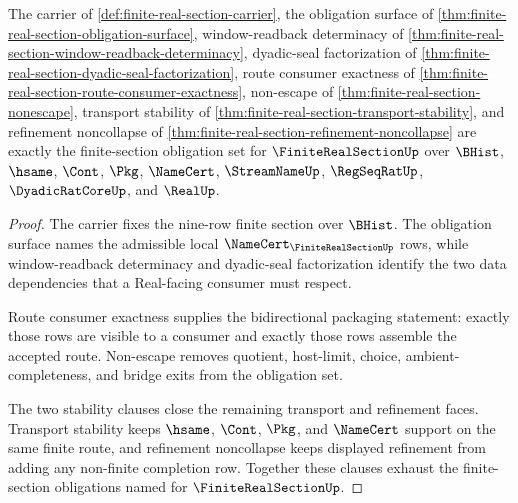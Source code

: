 \begin{theorem}
\label{thm:finite-real-section-obligation-closure-package}
The carrier of \autoref{def:finite-real-section-carrier}, the obligation surface of \autoref{thm:finite-real-section-obligation-surface}, window-readback determinacy of \autoref{thm:finite-real-section-window-readback-determinacy}, dyadic-seal factorization of \autoref{thm:finite-real-section-dyadic-seal-factorization}, route consumer exactness of \autoref{thm:finite-real-section-route-consumer-exactness}, non-escape of \autoref{thm:finite-real-section-nonescape}, transport stability of \autoref{thm:finite-real-section-transport-stability}, and refinement noncollapse of \autoref{thm:finite-real-section-refinement-noncollapse} are exactly the finite-section obligation set for $\FiniteRealSectionUp$ over $\BHist$, $\hsame$, $\Cont$, $\Pkg$, $\NameCert$, $\StreamNameUp$, $\RegSeqRatUp$, $\DyadicRatCoreUp$, and $\RealUp$.
\end{theorem}
\begin{proof}
The carrier fixes the nine-row finite section over $\BHist$. The obligation surface names the admissible local $\NameCert_{\FiniteRealSectionUp}$ rows, while window-readback determinacy and dyadic-seal factorization identify the two data dependencies that a Real-facing consumer must respect.

Route consumer exactness supplies the bidirectional packaging statement: exactly those rows are visible to a consumer and exactly those rows assemble the accepted route. Non-escape removes quotient, host-limit, choice, ambient-completeness, and bridge exits from the obligation set.

The two stability clauses close the remaining transport and refinement faces. Transport stability keeps $\hsame$, $\Cont$, $\Pkg$, and $\NameCert$ support on the same finite route, and refinement noncollapse keeps displayed refinement from adding any non-finite completion row. Together these clauses exhaust the finite-section obligations named for $\FiniteRealSectionUp$.
\end{proof}

